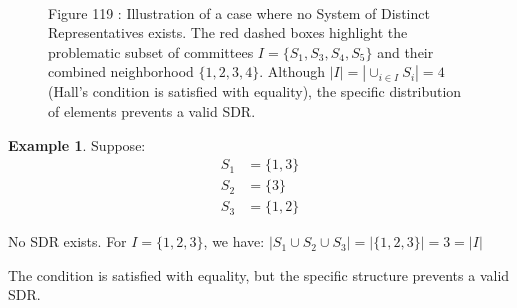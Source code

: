 \documentclass{article}
\theoremstyle{definition}
\newtheorem{example}{Example}
\begin{document}
\begin{figure}[ht]
\\
\small Figure 119 : {Illustration of a case where no System of Distinct Representatives exists. The red dashed boxes highlight the problematic subset of committees $I = \{S_1, S_3, S_4, S_5\}$ and their combined neighborhood $\{1, 2, 3, 4\}$. Although $|I| = |\cup_{i \in I} S_i| = 4$ (Hall's condition is satisfied with equality), the specific distribution of elements prevents a valid SDR.}
\end{figure}

\pagebreak
\newpage
\clearpage

\begin{example}
Suppose:
\begin{align*}
S_1 &= \{1,3\} \\
S_2 &= \{3\} \\
S_3 &= \{1,2\}
\end{align*}

No SDR exists. For $I = \{1,2,3\}$, we have:
$|S_1\cup S_2\cup S_3| = |\{1,2,3\}| = 3 = |I|$

The condition is satisfied with equality, but the specific structure prevents a valid SDR.
\end{example}
\end{document}
